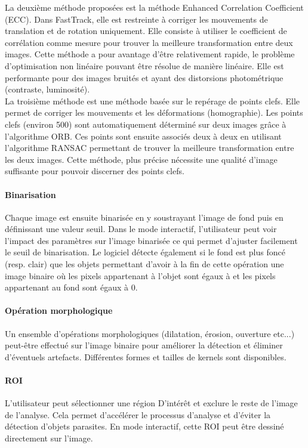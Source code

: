 		La deuxième méthode proposées est la méthode Enhanced Correlation Coefficient (ECC). Dans FastTrack, elle est restreinte à corriger les mouvements de translation et de rotation uniquement. Elle consiste à utiliser le coefficient de corrélation comme mesure pour trouver la meilleure transformation entre deux images. Cette méthode a pour avantage d'être relativement rapide, le problème d'optimisation non linéaire pouvant être résolue de manière linéaire. Elle est performante pour des images bruités et ayant des distorsions photométrique (contraste, luminosité).\\
		
		La troisième méthode est une méthode basée sur le repérage de points clefs. Elle permet de corriger les mouvements et les déformations (homographie). Les points clefs (environ 500) sont automatiquement déterminé sur deux images grâce à l'algorithme ORB. Ces points sont ensuite associés deux à deux en utilisant l’algorithme RANSAC permettant de trouver la meilleure transformation entre les deux images. Cette méthode, plus précise nécessite une qualité d'image suffisante pour pouvoir discerner des points clefs.
		
		
		\paragraph{Binarisation}
		Chaque image est ensuite binarisée en y soustrayant l'image de fond puis en définissant une valeur seuil. Dans le mode interactif, l'utilisateur peut voir l'impact des paramètres sur l'image binarisée ce qui permet d'ajuster facilement le seuil de binarisation. Le logiciel détecte également si le fond est plus foncé (resp. clair) que les objets permettant d'avoir à la fin de cette opération une image binaire  où les pixels appartenant à l’objet sont égaux à  et les pixels appartenant au fond sont égaux à 0.
		
		
		\paragraph{Opération morphologique}
		Un ensemble d'opérations morphologiques (dilatation, érosion, ouverture etc...) peut-être effectué sur l'image binaire pour améliorer la détection et éliminer d'éventuels artefacts. Différentes formes et tailles de kernels sont disponibles.
		
		
		\paragraph{ROI}
		L'utilisateur peut sélectionner une région D’intérêt et exclure le reste de l'image de l'analyse. Cela permet d'accélérer le processus d'analyse et d'éviter la détection d’objets parasites. En mode interactif, cette ROI peut être dessiné directement sur l'image.
		
